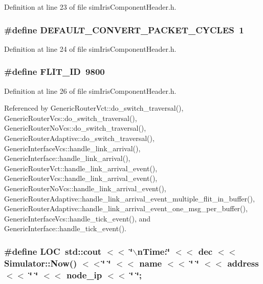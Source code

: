 Definition at line 23 of file simIrisComponentHeader.h.
\subsubsection[{DEFAULT\_\-CONVERT\_\-PACKET\_\-CYCLES}]{\setlength{\rightskip}{0pt plus 5cm}\#define DEFAULT\_\-CONVERT\_\-PACKET\_\-CYCLES~1}\label{simIrisComponentHeader_8h_4cd25c48b8874affbec9785d9d4ba055}




Definition at line 24 of file simIrisComponentHeader.h.
\subsubsection[{FLIT\_\-ID}]{\setlength{\rightskip}{0pt plus 5cm}\#define FLIT\_\-ID~9800}\label{simIrisComponentHeader_8h_4c17fe87d84664c123df538e6be7fa5c}




Definition at line 26 of file simIrisComponentHeader.h.

Referenced by GenericRouterVct::do\_\-switch\_\-traversal(), GenericRouterVcs::do\_\-switch\_\-traversal(), GenericRouterNoVcs::do\_\-switch\_\-traversal(), GenericRouterAdaptive::do\_\-switch\_\-traversal(), GenericInterfaceVcs::handle\_\-link\_\-arrival(), GenericInterface::handle\_\-link\_\-arrival(), GenericRouterVct::handle\_\-link\_\-arrival\_\-event(), GenericRouterVcs::handle\_\-link\_\-arrival\_\-event(), GenericRouterNoVcs::handle\_\-link\_\-arrival\_\-event(), GenericRouterAdaptive::handle\_\-link\_\-arrival\_\-event\_\-multiple\_\-flit\_\-in\_\-buffer(), GenericRouterAdaptive::handle\_\-link\_\-arrival\_\-event\_\-one\_\-msg\_\-per\_\-buffer(), GenericInterfaceVcs::handle\_\-tick\_\-event(), and GenericInterface::handle\_\-tick\_\-event().
\subsubsection[{LOC}]{\setlength{\rightskip}{0pt plus 5cm}\#define LOC~std::cout $<$$<$ \char`\"{}$\backslash$nTime:\char`\"{} $<$$<$ dec $<$$<$ Simulator::Now() $<$$<$\char`\"{} \char`\"{} $<$$<$ name $<$$<$ \char`\"{} \char`\"{} $<$$<$ address $<$$<$ \char`\"{} \char`\"{} $<$$<$ node\_\-ip $<$$<$ \char`\"{} \char`\"{};}\label{simIrisComponentHeader_8h_0fee446a4a4ef6536664bc1ff47ff694}





